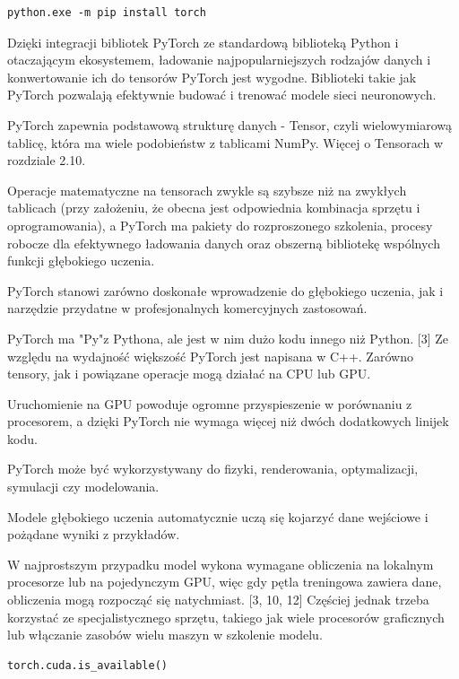\documentclass[brudnopis]{xmgr}
\begin{document}
\begin{lstlisting}
python.exe -m pip install torch
\end{lstlisting}


Dzięki integracji bibliotek PyTorch ze standardową biblioteką Python i otaczającym ekosystemem, ładowanie najpopularniejszych rodzajów danych i konwertowanie ich do tensorów PyTorch jest wygodne.􏰹Biblioteki takie jak PyTorch pozwalają efektywnie budować i trenować modele sieci neuronowych.

PyTorch zapewnia podstawową strukturę danych - Tensor, czyli wielowymiarową tablicę, która ma wiele podobieństw z tablicami NumPy. Więcej o Tensorach w rozdziale 2.10.

Operacje matematyczne na tensorach zwykle są szybsze niż na zwykłych tablicach (przy założeniu, że obecna jest odpowiednia kombinacja sprzętu i oprogramowania), a PyTorch ma pakiety do rozproszonego szkolenia, procesy robocze dla efektywnego ładowania danych oraz obszerną bibliotekę wspólnych funkcji głębokiego uczenia.

PyTorch stanowi zarówno doskonałe wprowadzenie do głębokiego uczenia, jak i narzędzie przydatne w profesjonalnych komercyjnych zastosowań.

PyTorch ma "Py"z Pythona, ale jest w nim dużo kodu innego niż Python. [3]
Ze względu na wydajność większość PyTorch jest napisana w C++. 
Zarówno tensory, jak i powiązane operacje mogą działać na CPU lub GPU. 

Uruchomienie na GPU powoduje ogromne przyspieszenie w porównaniu z procesorem, a dzięki PyTorch nie wymaga więcej niż dwóch dodatkowych linijek kodu.

PyTorch może być wykorzystywany do fizyki, renderowania, optymalizacji, symulacji czy modelowania.

Modele głębokiego uczenia automatycznie uczą się kojarzyć dane wejściowe i pożądane wyniki z przykładów.

W najprostszym przypadku model wykona wymagane obliczenia na lokalnym procesorze lub na pojedynczym GPU, więc gdy pętla treningowa zawiera dane, obliczenia mogą rozpocząć się natychmiast. [3, 10, 12] Częściej jednak trzeba korzystać ze specjalistycznego sprzętu, takiego jak wiele procesorów graficznych lub włączanie zasobów wielu maszyn w szkolenie modelu.
\\

\begin{lstlisting}
torch.cuda.is_available()
\end{lstlisting}
\end{document}
